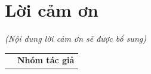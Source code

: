 \chapter*{Lời cảm ơn}

\textit{(Nội dung lời cảm ơn sẽ được bổ sung)}


{
\begin{table}[ht]
\centering
\begin{tabular}{>{\centering}m{}>{\centering\arraybackslash}m{}}
 & \textbf{Nhóm tác giả}
\end{tabular}
\end{table}
}
